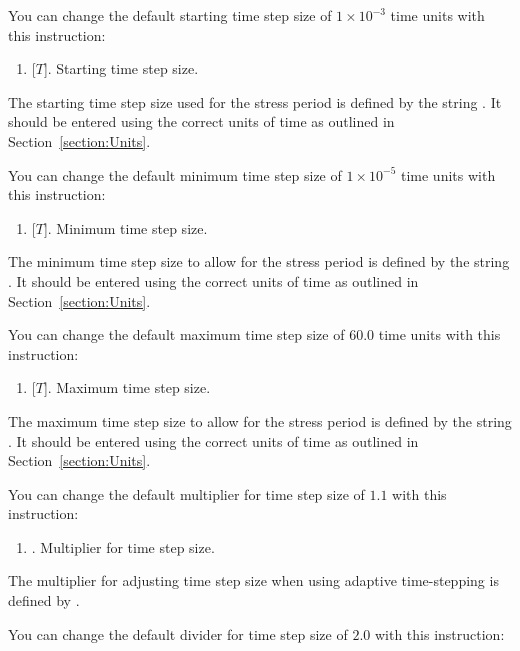You can change the default  starting time step size of  $1\times10^{-3}$ time units with this instruction:

    {
        \squish
        \begin{enumerate}
        \item {} [$T$].  Starting time step size.
        \end{enumerate}
        The  starting time step size used for the stress period  is defined by the string .  It should be entered using the correct units of time as outlined in Section~\ref{section:Units}.
    }

You can change the default  minimum time step size of  $1\times10^{-5}$ time units with this instruction:

    {
        \squish
        \begin{enumerate}
        \item {} [$T$].  Minimum time step size.
        \end{enumerate}
        The minimum time step size to allow for the stress period is defined by the string .  It should be entered using the correct units of time as outlined in Section~\ref{section:Units}.
    }

You can change the default  maximum time step size of  $60.0$ time units with this instruction:

    {
        \squish
        \begin{enumerate}
        \item {} [$T$]. Maximum time step size.
        \end{enumerate}
        The maximum time step size to allow for the stress period is defined by the string .  It should be entered using the correct units of time as outlined in Section~\ref{section:Units}.
    }


You can change the default multiplier for time step size of  $1.1$  with this instruction:

    {
        \squish
        \begin{enumerate}
        \item {}.  Multiplier for time step size.
        \end{enumerate}
        The multiplier for adjusting time step size when using adaptive time-stepping is defined by .
    }

You can change the default divider for time step size of  $2.0$  with this instruction:

